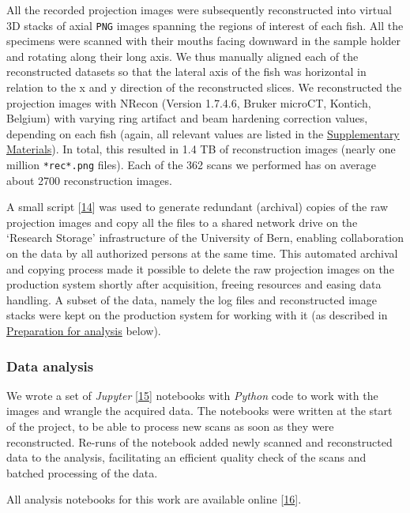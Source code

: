 All the recorded projection images were subsequently reconstructed into virtual 3D stacks of axial \texttt{PNG} images spanning the regions of interest of each fish.
All the specimens were scanned with their mouths facing downward in the sample holder and rotating along their long axis.
We thus manually aligned each of the reconstructed datasets so that the lateral axis of the fish was horizontal in relation to the x and y direction of the reconstructed slices.
We reconstructed the projection images with NRecon (Version 1.7.4.6, Bruker microCT, Kontich, Belgium) with varying ring artifact and beam hardening correction values, depending on each fish (again, all relevant values are listed in the \protect\hyperlink{supplementary-materials}{Supplementary Materials}).
In total, this resulted in 1.4 TB of reconstruction images (nearly one million \texttt{*rec*.png} files).
Each of the 362 scans we performed has on average about 2700 reconstruction images.

A small script {[}\protect\hyperlink{ref-ZjgrPHTa}{14}{]} was used to generate redundant (archival) copies of the raw projection images and copy all the files to a shared network drive on the `Research Storage' infrastructure of the University of Bern, enabling collaboration on the data by all authorized persons at the same time.
This automated archival and copying process made it possible to delete the raw projection images on the production system shortly after acquisition, freeing resources and easing data handling.
A subset of the data, namely the log files and reconstructed image stacks were kept on the production system for working with it (as described in \protect\hyperlink{preparation-for-analysis}{Preparation for analysis} below).

\hypertarget{data-analysis}{%
\subsubsection{Data analysis}\label{data-analysis}}

We wrote a set of \emph{Jupyter} {[}\protect\hyperlink{ref-pQ6Wbz73}{15}{]} notebooks with \emph{Python} code to work with the images and wrangle the acquired data.
The notebooks were written at the start of the project, to be able to process new scans as soon as they were reconstructed.
Re-runs of the notebook added newly scanned and reconstructed data to the analysis, facilitating an efficient quality check of the scans and batched processing of the data.

All analysis notebooks for this work are available online {[}\protect\hyperlink{ref-1HteOscVd}{16}{]}.

